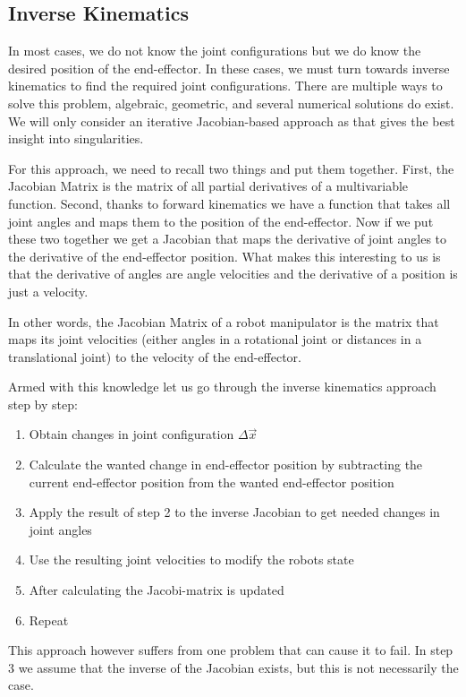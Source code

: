 \documentclass[journal]{IEEEtran}
\begin{document}
\subsection{Inverse Kinematics}
In most cases, we do not know the joint configurations but we do know the desired position of the end-effector. In these cases, we must turn towards inverse kinematics to find the required joint configurations. There are multiple ways to solve this problem, algebraic, geometric, and several numerical solutions do exist. We will only consider an iterative Jacobian-based approach\cite[94]{GdR} as that gives the best insight into singularities.

For this approach, we need to recall two things and put them together. First, the Jacobian Matrix is the matrix of all partial derivatives of a multivariable function. Second, thanks to forward kinematics we have a function that takes all joint angles and maps them to the position of the end-effector. Now if we put these two together we get a Jacobian that maps the derivative of joint angles to the derivative of the end-effector position. What makes this interesting to us is that the derivative of angles are angle velocities and the derivative of a position is just a velocity.

In other words, the Jacobian Matrix of a robot manipulator is the matrix that maps its joint velocities (either angles in a rotational joint or distances in a translational joint) to the velocity of the end-effector\cite[29]{HandbookOfRobotics}.

Armed with this knowledge let us go through the inverse kinematics approach step by step\cite[95]{GdR}:
\begin{enumerate}
    \item Obtain changes in joint configuration $\Delta\vec{x}$
    \item Calculate the wanted change in end-effector position by subtracting the current end-effector position from the wanted end-effector position
    \item Apply the result of step 2 to the inverse Jacobian to get needed changes in joint angles
    \item Use the resulting joint velocities to modify the robots state
    \item After calculating  the Jacobi-matrix is updated
    \item Repeat
\end{enumerate}

This approach however suffers from one problem that can cause it to fail. In step 3 we assume that the inverse of the Jacobian exists, but this is not necessarily the case.
\end{document}
